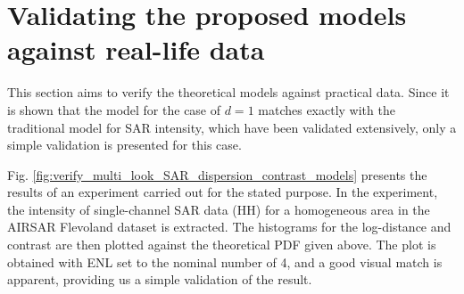 \documentclass[journal]{IEEEtran}
\begin{document}
     
\section{Validating the proposed models against real-life data}
\label{sec:polsar_models_validation}

This section aims to verify the theoretical models against practical data.
Since it is shown that the model for the case of $d=1$ matches exactly with the traditional model for SAR intensity,
  which have been validated extensively, only a simple validation is presented for this case.
  
Fig. \ref{fig:verify_multi_look_SAR_dispersion_contrast_models} presents the results of an experiment carried out for the stated purpose.
In the experiment, the intensity of single-channel SAR data (HH) for a homogeneous area in the AIRSAR Flevoland dataset is extracted.
The histograms for the log-distance and contrast are then plotted against the theoretical PDF given above.
 The plot is obtained with ENL set to the nominal number of 4, and a good visual match is apparent, providing us a simple validation of the result.
\end{document}
